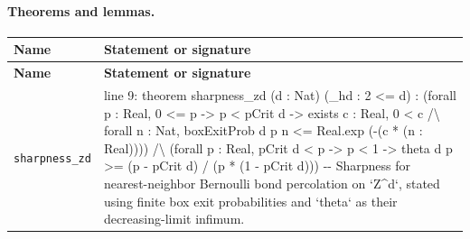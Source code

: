 \documentclass[10pt]{article}
\begin{document}
\paragraph{Theorems and lemmas.}
\begin{longtable}{>{\raggedright\arraybackslash}p{} >{\raggedright\arraybackslash}p{}}
\textbf{Name} & \textbf{Statement or signature} \\
\hline
\endfirsthead
\textbf{Name} & \textbf{Statement or signature} \\
\hline
\endhead
\texttt{sharpness\_\allowbreak{}zd} & {\ttfamily\scriptsize line 9:\allowbreak{} theorem sharpness\_\allowbreak{}zd (\allowbreak{}d :\allowbreak{} Nat)\allowbreak{} (\allowbreak{}\_\allowbreak{}hd :\allowbreak{} 2 <=\allowbreak{} d)\allowbreak{} :\allowbreak{} (\allowbreak{}forall p :\allowbreak{} Real,\allowbreak{} 0 <=\allowbreak{} p -\allowbreak{}> p < pCrit d -\allowbreak{}> exists c :\allowbreak{} Real,\allowbreak{} 0 < c /\allowbreak{}\textbackslash{} forall n :\allowbreak{} Nat,\allowbreak{} boxExitProb d p n <=\allowbreak{} Real.\allowbreak{}exp (\allowbreak{}-\allowbreak{}(\allowbreak{}c *\allowbreak{} (\allowbreak{}n :\allowbreak{} Real)\allowbreak{})\allowbreak{})\allowbreak{})\allowbreak{} /\allowbreak{}\textbackslash{} (\allowbreak{}forall p :\allowbreak{} Real,\allowbreak{} pCrit d < p -\allowbreak{}> p < 1 -\allowbreak{}> theta d p >=\allowbreak{} (\allowbreak{}p -\allowbreak{} pCrit d)\allowbreak{} /\allowbreak{} (\allowbreak{}p *\allowbreak{} (\allowbreak{}1 -\allowbreak{} pCrit d)\allowbreak{})\allowbreak{})\allowbreak{} -\allowbreak{}-\allowbreak{} Sharpness for nearest-\allowbreak{}neighbor Bernoulli bond percolation on `Z\textasciicircum{}d`,\allowbreak{} stated using finite box exit probabilities and `theta` as their decreasing-\allowbreak{}limit infimum.\allowbreak{}} \\[0.45em]
\end{longtable}
\end{document}
